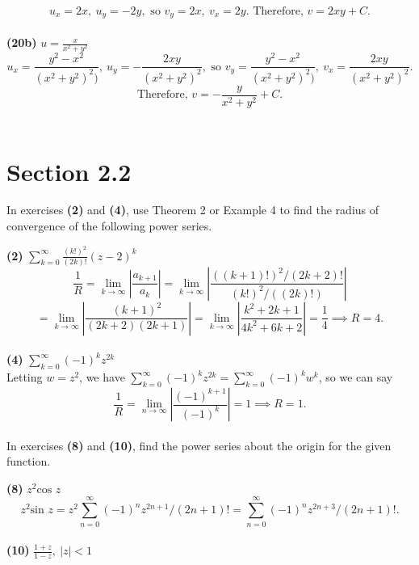 \documentclass[12pt,letterpaper]{article}
\begin{document}
\[u_{x} = 2x,\ u_{y} = -2y, \text{ so } v_{y} = 2x,\ v_{x} = 2y. \text{ Therefore, } v = 2xy+C.\] \\

\textbf{(20b)} \(u = \frac{x}{x^{2} + y^{2}}\) \\
	
\[u_{x} = \frac{y^{2}-x^{2}}{(x^{2}+y^{2})^{2})},\ u_{y} = -\frac{2xy}{(x^{2} + y^{2})^{2}}, \text{ so } v_{y} = \frac{y^{2}-x^{2}}{(x^{2}+y^{2})^{2})},\ v_{x} = \frac{2xy}{(x^{2} + y^{2})^{2}}.\]\[ \text{Therefore, } v = -\frac{y}{x^{2}+y^{2}} + C.\] \\
	
\section*{Section 2.2} 

In exercises \textbf{(2)} and \textbf{(4)}, use Theorem 2 or Example 4 to find the radius of convergence of the following power series.

\textbf{(2)} \(\sum_{k=0}^{\infty}\frac{(k!)^{2}}{(2k)!}(z-2)^{k}\) \\

\[\frac{1}{R} = \lim_{k \to \infty} \left| \frac{a_{k+1}}{a_{k}} \right| = \lim_{k \to \infty} \left| \frac{((k+1)!)^{2}/(2k+2)!}{(k!)^{2}/((2k)!)} \right|\] \[ = \lim_{k \to \infty} \left| \frac{(k+1)^{2}}{(2k+2)(2k+1)} \right| = \lim_{k \to \infty} \left| \frac{k^{2}+2k+1}{4k^{2}+6k+2} \right| = \frac{1}{4} \implies R = 4.\] \\

\textbf{(4)} \(\sum_{k=0}^{\infty}(-1)^{k}z^{2k}\) \\

Letting \(w = z^{2}\), we have \(\sum_{k=0}^{\infty} (-1)^{k}z^{2k} = \sum_{k=0}^{\infty}(-1)^{k}w^{k}\), so we can say \[\frac{1}{R} = \lim_{n\to \infty} \left| \frac{(-1)^{k+1}}{(-1)^{k}} \right| = 1 \implies R = 1.\] \\

In exercises \textbf{(8)} and \textbf{(10)}, find the power series about the origin for the given function.

\textbf{(8)} \(z^{2}\text{cos } z\) \\

\[z^{2}\text{sin } z = z^{2} \sum_{n=0}^{\infty} (-1)^{n}z^{2n+1}/(2n+1)! = \sum_{n=0}^{\infty} (-1)^{n}z^{2n+3}/(2n+1)!.\] \\

\textbf{(10)} \(\frac{1+z}{1-z},\ |z|<1\) \\
\end{document}
